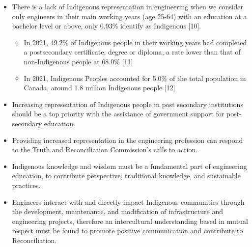 \begin{itemize}
 \item There is a lack of Indigenous representation in engineering when we consider only engineers in their main working years (age 25-64) with an education at a bachelor level or above, only 0.93\% identify as Indigenous [10].
 \begin{itemize}
  \item In 2021, 49.2\% of Indigenous people in their working years had completed a postsecondary certificate, degree or diploma, a rate lower than that of non-Indigenous people at 68.0\% [11]
  \item In 2021, Indigenous Peoples accounted for 5.0\% of the total population in Canada, around 1.8 million Indigenous people [12]
 \end{itemize}
 \item Increasing representation of Indigenous people in post secondary institutions should be a top priority with the assistance of government support for post-secondary education.
 \item Providing increased representation in the engineering profession can respond to the Truth and Reconciliation Commission's calls to action.
 \item Indigenous knowledge and wisdom must be a fundamental part of engineering education, to contribute perspective, traditional knowledge, and sustainable practices.
 \item Engineers interact with and directly impact Indigenous communities through the development, maintenance, and modification of infrastructure and engineering projects, therefore an intercultural understanding based in mutual respect must be found to promote positive communication and contribute to Reconciliation.
\end{itemize}


